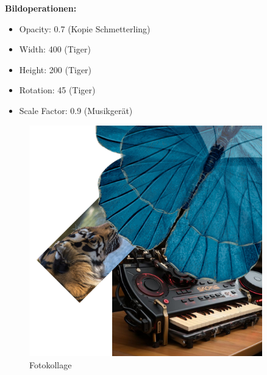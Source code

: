 \textbf{Bildoperationen:}
\begin{itemize}
	\item Opacity: 0.7 (Kopie Schmetterling)
	\item Width: 400 (Tiger)
	\item Height: 200 (Tiger)
	\item Rotation: 45 (Tiger)
	\item Scale Factor: 0.9 (Musikgerät)
\end{itemize}

\begin{figure}[!htbp]
	\centering
	\includegraphics[width=0.9\textwidth]{"images/img-ops.png"}
	\caption{Fotokollage}
	\label{fig:img-ops}
\end{figure}